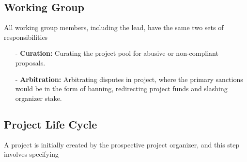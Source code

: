 \documentclass{article}
\begin{document}
\subsection{Working Group}

All working group members, including the lead, have the same two sets of responsibilities

\begin{itemize}
 \item[-] \textbf{Curation:} Curating the project pool for abusive or non-compliant proposals.
 \item[-] \textbf{Arbitration:} Arbitrating disputes in project, where the primary sanctions would be in the form of banning, redirecting project funds and slashing organizer stake.
\end{itemize}

\subsection{Project Life Cycle}

A project is initially created by the prospective project organizer, and this step involves specifying
\end{document}
